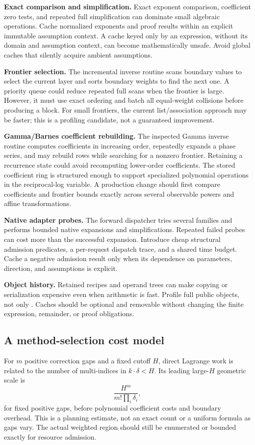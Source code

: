 \textbf{Exact comparison and simplification.} Exact exponent comparison, coefficient zero tests, and repeated full simplification can dominate small algebraic operations. Cache normalized exponents and proof results within an explicit immutable assumption context. A cache keyed only by an expression, without its domain and assumption context, can become mathematically unsafe. Avoid global caches that silently acquire ambient assumptions.\cite{core,inverseexpressions}

\textbf{Frontier selection.} The incremental inverse routine scans boundary values to select the current layer and sorts boundary weights to find the next one. A priority queue could reduce repeated full scans when the frontier is large. However, it must use exact ordering and batch all equal-weight collisions before producing a block. For small frontiers, the current list/association approach may be faster; this is a profiling candidate, not a guaranteed improvement.\cite{incremental}

\textbf{Gamma/Barnes coefficient rebuilding.} The inspected Gamma inverse routine computes coefficients in increasing order, repeatedly expands a phase series, and may rebuild rows while searching for a nonzero frontier. Retaining a recurrence state could avoid recomputing lower-order coefficients. The stored coefficient ring is structured enough to support specialized polynomial operations in the reciprocal-log variable. A production change should first compare coefficients and frontier bounds exactly across several observable powers and affine transformations.\cite{gamma}

\textbf{Native adapter probes.} The forward dispatcher tries several families and performs bounded native expansions and simplifications. Repeated failed probes can cost more than the successful expansion. Introduce cheap structural admission predicates, a per-request dispatch trace, and a shared time budget. Cache a negative admission result only when its dependence on parameters, direction, and assumptions is explicit.\cite{inverseexpressions,native,sourcecharts}

\textbf{Object history.} Retained recipes and operand trees can make copying or serialization expensive even when arithmetic is fast. Profile full public objects, not only . Caches should be optional and removable without changing the finite expression, remainder, or proof obligations.

\subsection{A method-selection cost model}
For $m$ positive correction gaps and a fixed cutoff $H$, direct Lagrange work is related to the number of multi-indices in $k\cdot\delta<H$. Its leading large-$H$ geometric scale is
\[
 \frac{H^m}{m!\prod_i\delta_i},
\]
for fixed positive gaps, before polynomial coefficient costs and boundary overhead. This is a planning estimate, not an exact count or a uniform formula as gaps vary. The actual weighted region should still be enumerated or bounded exactly for resource admission.


